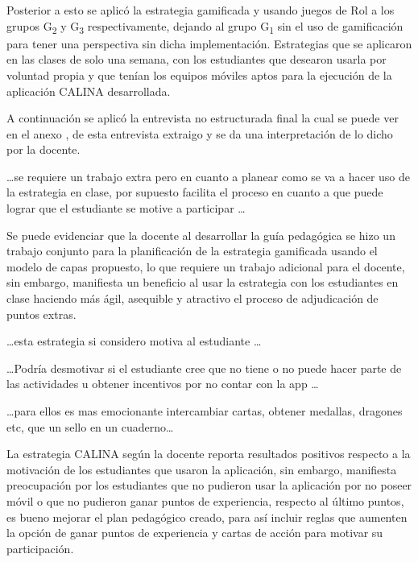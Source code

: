 Posterior a esto se aplicó la estrategia gamificada y usando juegos de Rol a los grupos G\textsubscript{2} y 
G\textsubscript{3} respectivamente, dejando al grupo G\textsubscript{1} sin el uso de gamificación para tener 
una perspectiva sin dicha implementación. Estrategias que se aplicaron en las clases de solo una semana, con 
los estudiantes que desearon usarla por voluntad propia y que tenían los equipos móviles aptos para la 
ejecución de la aplicación CALINA desarrollada.

A continuación se aplicó la entrevista no estructurada final la cual se puede ver en el anexo 
\label{anexo:encuestas}, de esta entrevista extraigo y se da una interpretación de lo dicho por la docente.

\begin{displayquote}
	\dots se requiere un trabajo extra pero en cuanto a planear como se va a hacer uso de la estrategia en 
	clase, por supuesto facilita el proceso en cuanto a que puede lograr que el estudiante se motive a 
	participar \dots
\end{displayquote}

Se puede evidenciar que la docente al desarrollar la guía pedagógica se hizo un trabajo conjunto para la 
planificación de la estrategia gamificada usando el modelo de capas propuesto, lo que requiere un trabajo 
adicional para el docente, sin embargo, manifiesta un beneficio al usar la estrategia con los estudiantes en 
clase haciendo más ágil, asequible y atractivo el proceso de adjudicación de puntos extras.

\begin{displayquote}
	\dots esta estrategia si considero motiva al estudiante \dots

	\dots Podría desmotivar si el estudiante cree que no tiene o no puede hacer parte de las actividades u 
	obtener incentivos por no contar con la app \dots

	\dots para ellos es mas emocionante intercambiar cartas, obtener medallas, dragones etc, que un sello 
	en un cuaderno\dots
\end{displayquote}

La estrategia CALINA según la docente reporta resultados positivos respecto a la motivación de los estudiantes 
que usaron la aplicación, sin embargo, manifiesta preocupación por los estudiantes que no pudieron usar la 
aplicación por no poseer móvil o que no pudieron ganar puntos de experiencia, respecto al último puntos, es 
bueno mejorar el plan pedagógico creado, para así incluir reglas que aumenten la opción de ganar puntos de 
experiencia y cartas de acción para motivar su participación.

